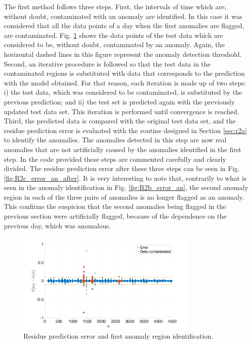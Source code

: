 \documentclass[]{scrartcl}
\begin{document}
The first method follows three steps. First, the intervals of time which are, without doubt, contaminated with an anomaly are identified. In this case it was considered that all the data points of a day when the first anomalies are flagged, are contaminated. Fig. \ref{fig:R2c_error_an} shows the data points of the test data which are considered to be, without doubt, contaminated by an anomaly. Again, the horizontal dashed lines in this figure represent the anomaly detection threshold. Second, an iterative procedure is followed so that the test data in the contaminated regions is substituted with data that corresponds to the prediction with the model obtained. For that reason, each iteration is made up of two steps: i) the test data, which was considered to be contaminated, is substituted by the previous prediction; and ii) the test set is predicted again with the previously updated test data set. This iteration is performed until convergence is reached. Third, the predicted data is compared with the original test data set, and the residue prediction error is evaluated with the routine designed in Section \ref{sec:r2a} to identify the anomalies. The anomalies detected in this step are now real anomalies that are not artificially caused by the anomalies identified in the first step. In the code provided these steps are commented carefully and clearly divided. The residue prediction error after these three steps can be seen in Fig. \ref{fig:R2c_error_an_after}. It is very interesting to note that, contrarily to what is seen in the anomaly identification in Fig. \ref{fig:R2b_error_an}, the second anomaly region in each of the three pairs of anomalies is no longer flagged as an anomaly. This confirms the suspicion that the second anomalies being flagged in the previous section were artificially flagged, because of the dependence on the previous day, which was anomalous. 

\begin{figure}[htbp]
	\centering
	\includegraphics[width= 0.8\textwidth]{figures/R2c_error_an.png}
	\caption{Residue prediction error and first anomaly region identification.}
	\label{fig:R2c_error_an}
\end{figure}
\end{document}
